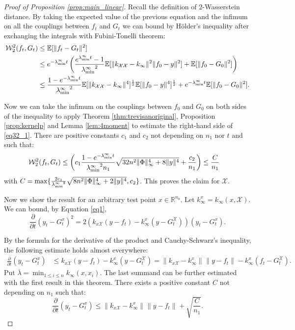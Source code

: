 \documentclass{article}
\theoremstyle{definition}
\theoremstyle{remark}
\numberwithin{equation}{section}
\newcommand{\X}{\mathcal{X}}
\newcommand{\R}{\mathbb{R}}
\newcommand{\E}{\mathbb{E}}
\newcommand{\ktest}{k_{x\X}}
\newcommand{\ktrain}{k_{\X\X}}
\newcommand{\lammin}{\lambda_{\textup{min}}}
\newcommand{\norm}[2]{
    \|#1\|_{#2}
}
\begin{document}
\begin{proof}[Proof of Proposition \ref{prop:main_linear}]
Recall the definition of $2$-Wasserstein distance.
By taking the expected value of the previous equation and the infimum on all the couplings between $f_t$ and $G_t$ we can bound by Hölder's inequality after exchanging the integrals with Fubini-Tonelli theorem:
\begin{align}
    \mathcal W^2_2(f_t,G_t) &\le \E[\norm{f_t-G_t}{}^2] \\ 
    &\le e^{-\lammin^\infty t} \left(\frac{e^{\lammin^\infty t}-1}{{\lammin^\infty}^2}\E[\norm{\ktrain - k_\infty}{}^2\norm{f_0-y}{}^2]  + \E[\norm{f_0-G_0}{}^2]\right)\\
    &\label{eq32_1} \le \frac{1-e^{-\lammin^\infty t}}{{\lammin^\infty}^2}\E[\norm{\ktrain - k_\infty}{}^4]^\frac{1}{2}\E[\norm{f_0-y}{}^4]^\frac{1}{2}  + e^{-\lammin^\infty t}\E[\norm{f_0-G_0}{}^2].
\end{align}

Now we can take the infimum on the couplings between $f_0$ and $G_0$ on both sides of the inequality to apply Theorem \ref{thm:trevisanoriginal}, Proposition \ref{prop:kernelp} and Lemma \ref{lem:4moment}
     to estimate the right-hand side of \eqref{eq32_1}.
    There are positive constants $c_1$ and $c_2$ not depending on $n_1$ nor $t$ and such that:
    \begin{align}
        \mathcal W^2_2(f_t,G_t) &\le \left(c_1\frac{1-e^{-\lammin^\infty t}}{{\lammin^\infty}^2 n_1}\sqrt{32n^2\norm{\Phi}{\infty}^4 + 8\norm{y}{}^4}  + \frac{c_2}{n_1}\right)
        \le \frac{C}{n_1}
    \end{align}
    with $C = \max\{\frac{2c_1}{{\lammin^\infty}^2}\sqrt{8n^2\norm{\Phi}{\infty}^4 + 2\norm{y}{}^4},c_2\}$.
This proves the claim for $\X$.

Now we show the result for an arbitrary test point $x \in \R^{n_0}$.
Let $k_\infty^x = k_\infty(x,\X)$.
We can bound, by Equation \eqref{eq1},
    \[
        \frac{\partial}{\partial t} (y_t-G_t^x)^2 = 2(\ktest (y-f_t)-k_\infty^x(y-G_t^\X))(y_t-G_t^x).
    \]

By the formula for the derivative of the product and Cauchy-Schwarz's inequality, the following estimate holds almost everywhere:
    \begin{align}
        \frac{\partial}{\partial t} (y_t-G_t^x) &\le \ktest (y-f_t)-k_\infty^x(y-G_t^\X)
        = \norm{\ktest-k_\infty^x}{} \norm{y-f_t}{}-k_\infty^x(f_t-G_t^\X).
    \end{align}
    Put $\overline \lambda = \min_{1\le i\le n}k_\infty(x,x_i)$.
    The last summand can be further estimated with the first result in this theorem.
    There exists a positive constant $C$ not depending on $n_1$ such that:
    \begin{equation}
        \label{eqaux_test1}\frac{\partial}{\partial t} (y_t-G_t^x) \le \norm{\ktest-k_\infty^x}{} \norm{y-f_t}{}+\sqrt{\frac{C}{n_1}}.
    \end{equation}


\end{proof}
\end{document}
